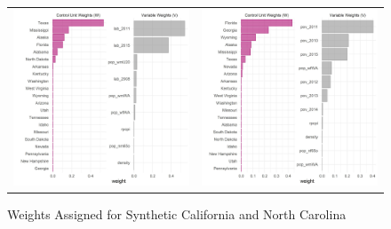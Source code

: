 \documentclass{article}
\begin{document}
\begin{figure}
\begin{center}
\caption{Weights Assigned for Synthetic California and North Carolina}
\label{fig:weights}{}
\begin{tabular}{cc}
 \includegraphics[width=80mm]{ca_lab_weights} &   \includegraphics[width=80mm]{ca_pov_weights} \\

\end{tabular}
\end{center}
\end{figure}
\end{document}
